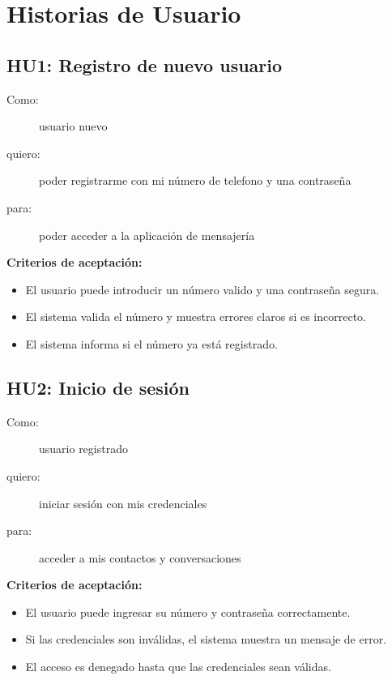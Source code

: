 \section*{Historias de Usuario}

\subsection*{HU1: Registro de nuevo usuario}
\begin{description}
  \item[Como:] usuario nuevo
  \item[quiero:] poder registrarme con mi número  de telefono y una contraseña
  \item[para:] poder acceder a la aplicación de mensajería
\end{description}

\textbf{Criterios de aceptación:}
\begin{itemize}
    \item El usuario puede introducir un número valido y una contraseña segura.
    \item El sistema valida el número y muestra errores claros si es incorrecto.
    \item El sistema informa si el número ya está registrado.
\end{itemize}

\subsection*{HU2: Inicio de sesión}
\begin{description}
  \item[Como:] usuario registrado
  \item[quiero:] iniciar sesión con mis credenciales
  \item[para:] acceder a mis contactos y conversaciones
\end{description}

\textbf{Criterios de aceptación:}
\begin{itemize}
    \item El usuario puede ingresar su número y contraseña correctamente.
    \item Si las credenciales son inválidas, el sistema muestra un mensaje de error.
    \item El acceso es denegado hasta que las credenciales sean válidas.
\end{itemize}

